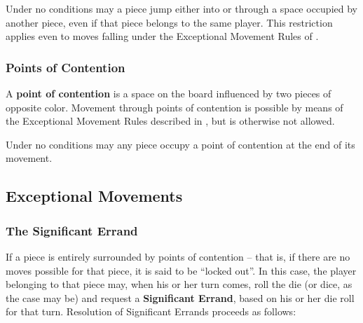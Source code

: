 Under no conditions may a piece jump either into or through a
space occupied by another piece, even if that piece belongs to
the same player.  This restriction applies even to moves
falling under the Exceptional Movement Rules of .

\subsubsection{Points of Contention}\label{contention}
A {\bf point of contention} is a space on the board influenced by two
pieces of opposite color.  Movement through points of contention is
possible by means of the Exceptional Movement Rules described in
, but is otherwise not allowed.

Under no conditions may any piece occupy a point of contention
at the end of its movement.


\subsection{Exceptional Movements}\label{move_except}

\subsubsection{The Significant Errand}\label{errand}

If a piece is entirely surrounded by points of contention -- that is, if there are no moves
possible for that piece, it is said to be ``locked out''.  In this case, the player
belonging to that piece may, when his or her turn comes, roll the
die (or dice, as the case may be) and request
a {\bf Significant Errand}, based on his or her die roll for
that turn.  Resolution of Significant Errands proceeds as follows:

